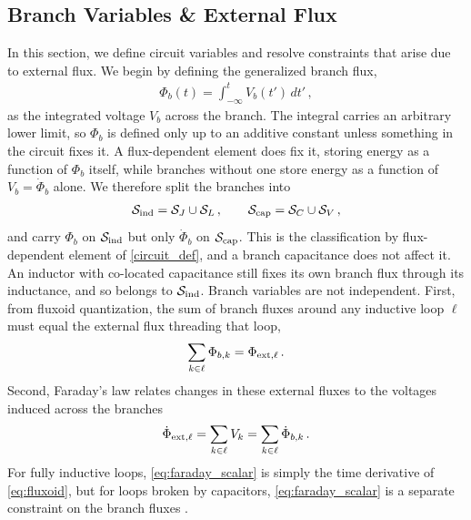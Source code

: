 \documentclass[10pt,aps,pra,onecolumn,superscriptaddress,floatfix,nofootinbib]{revtex4-2}
\begin{document}
\subsection{Branch Variables \& External Flux}\label{apx:flux_assign}

In this section, we define circuit variables and resolve constraints that arise due to external flux.
We begin by defining the generalized branch flux,
\begin{align}
    \Phi_b(t) = \int_{-\infty}^t V_b(t')\,dt' \, ,
\end{align}
as the integrated voltage $V_b$ across the branch.
The integral carries an arbitrary lower limit, so $\Phi_b$ is defined only up to an additive constant unless something in the circuit fixes it.
A flux-dependent element does fix it, storing energy as a function of $\Phi_b$ itself, while branches without one store energy as a function of $V_b = \dot\Phi_b$ alone.
We therefore split the branches into
\begin{align}
    \mathcal{S}_{\rm ind} = \mathcal{S}_J \cup \mathcal{S}_L \, , \qquad \mathcal{S}_{\rm cap} = \mathcal{S}_C \cup \mathcal{S}_V \, ,
    \label{eq:branch_split}
\end{align}
and carry $\Phi_b$ on $\mathcal{S}_{\rm ind}$ but only $\dot\Phi_b$ on $\mathcal{S}_{\rm cap}$.
This is the classification by flux-dependent element of \cref{circuit_def}, and a branch capacitance does not affect it.
An inductor with co-located capacitance still fixes its own branch flux through its inductance, and so belongs to $\mathcal{S}_{\rm ind}$.
Branch variables are not independent.
First, from fluxoid quantization, the sum of branch fluxes around any inductive loop $\ell$ must equal the external flux threading that loop, 
\begin{align}\label{eq:fluxoid}
\sum_{k\in\ell}\Phi_{b,k} = \Phi_{{\rm ext},\ell} \,. 
\end{align}
Second, Faraday's law relates changes in these external fluxes to the voltages induced across the branches
\begin{align}\label{eq:faraday_scalar}
\dot\Phi_{{\rm ext},\ell} = \sum_{k\in\ell}V_k = \sum_{k\in\ell}\dot\Phi_{b,k} \, .
\end{align}
For fully inductive loops, \cref{eq:faraday_scalar} is simply the time derivative of \cref{eq:fluxoid}, but for loops broken by capacitors, \cref{eq:faraday_scalar} is a separate constraint on the branch fluxes \cite{YouKoch2019}.
\end{document}
